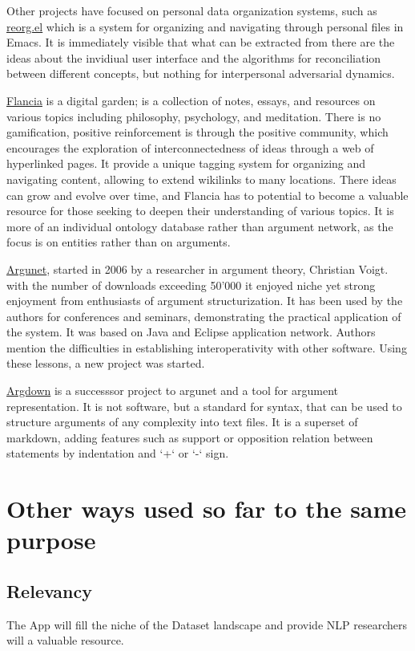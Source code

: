 \documentclass{report}
\begin{document}
Other projects have focused on personal data organization systems, such as \href{https://github.com/senters/reorg.el}{reorg.el} which is a system for organizing and navigating through personal files in Emacs. It is immediately visible that what can be extracted from there are the ideas about the invidiual user interface and the algorithms for reconciliation between different concepts, but nothing for interpersonal adversarial dynamics.

\href{https://flancia.org/}{Flancia} is a digital garden; is a collection of notes, essays, and resources on various topics including philosophy, psychology, and meditation. There is no gamification, positive reinforcement is through the positive community, which encourages the exploration of interconnectedness of ideas through a web of hyperlinked pages. It provide a unique tagging system for organizing and navigating content, allowing to extend wikilinks to many locations. There ideas can grow and evolve over time, and Flancia has to potential to become a valuable resource for those seeking to deepen their understanding of various topics. It is more of an individual ontology database rather than argument network, as the focus is on entities rather than on arguments.

\href{http://www.argunet.org/}{Argunet}, started in 2006 by a researcher in argument theory, Christian Voigt. with the number of downloads exceeding 50'000 it enjoyed niche yet strong enjoyment from enthusiasts of argument structurization. It has been used by the authors for conferences and seminars, demonstrating the practical application of the system. It was based on Java and Eclipse application network. Authors mention the difficulties in establishing interoperativity with other software. Using these lessons, a new project was started.

\href{https://argdown.org/}{Argdown} is a successsor project to argunet and a tool for argument representation. It is not software, but a standard for syntax, that can be used to structure arguments of any complexity into text files. It is a superset of markdown, adding features such as support or opposition relation between statements by indentation and `+` or `-` sign.

\section{Other ways used so far to the same purpose}

\subsection{Relevancy}
The App will fill the niche of the Dataset landscape and provide NLP researchers will a valuable resource.
\end{document}
